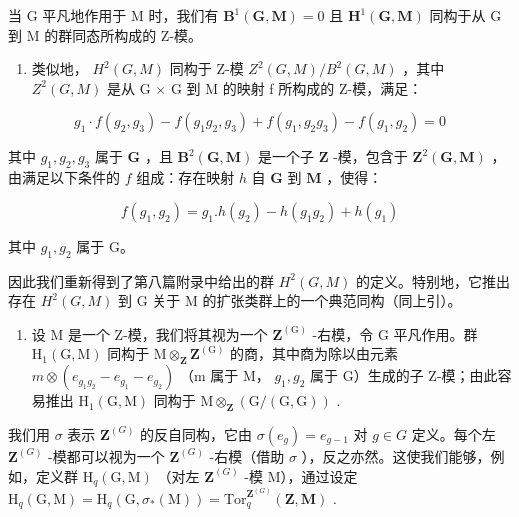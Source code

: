 当 G 平凡地作用于 M 时，我们有 \(\mathbf{B}^{1}(\mathbf{G},\mathbf{M})=0\) 且 \(\mathbf{H}^{1}(\mathbf{G},\mathbf{M})\) 同构于从 G 到 M 的群同态所构成的 Z-模。

\begin{enumerate}
\def\labelenumi{\arabic{enumi})}
\setcounter{enumi}{2}
\tightlist
\item
  类似地， \(H^{2}(G, M)\) 同构于 Z-模 \(Z^{2}(G, M)/B^{2}(G, M)\) ，其中 \(Z^{2}(G, M)\) 是从 G × G 到 M 的映射 f 所构成的 Z-模，满足：
\end{enumerate}

\[
g _ {1} \cdot f (g _ {2}, g _ {3}) - f (g _ {1} g _ {2}, g _ {3}) + f (g _ {1}, g _ {2} g _ {3}) - f (g _ {1}, g _ {2}) = 0
\]

其中 \(g_{1}, g_{2}, g_{3}\) 属于 \(\mathbf{G}\) ，且 \(\mathbf{B}^{2}(\mathbf{G}, \mathbf{M})\) 是一个子 \(\mathbf{Z}\) -模，包含于 \(\mathbf{Z}^{2}(\mathbf{G}, \mathbf{M})\) ，由满足以下条件的 \(f\) 组成：存在映射 \(h\) 自 \(\mathbf{G}\) 到 \(\mathbf{M}\) ，使得：

\[
f (g _ {1}, g _ {2}) = g _ {1}. h (g _ {2}) - h (g _ {1} g _ {2}) + h (g _ {1})
\]

其中 \(g_{1}, g_{2}\) 属于 G。

因此我们重新得到了第八篇附录中给出的群 \(H^{2}(G, M)\) 的定义。特别地，它推出存在 \(H^{2}(G, M)\) 到 G 关于 M 的扩张类群上的一个典范同构（同上引）。

\begin{enumerate}
\def\labelenumi{\arabic{enumi})}
\setcounter{enumi}{3}
\tightlist
\item
  设 M 是一个 Z-模，我们将其视为一个 \(\mathbf{Z}^{(\mathrm{G})}\) -右模，令 G 平凡作用。群 \(\mathrm{H}_{1}(\mathrm{G},\mathrm{M})\) 同构于 \(\mathrm{M}\otimes_{\mathbf{Z}}\mathbf{Z}^{(\mathrm{G})}\) 的商，其中商为除以由元素 \(m\otimes(e_{g_{1}g_{2}}-e_{g_{1}}-e_{g_{2}})\) （m 属于 M， \(g_{1}, g_{2}\) 属于 G）生成的子 Z-模；由此容易推出 \(\mathrm{H}_{1}(\mathrm{G},\mathrm{M})\) 同构于 \(\mathrm{M}\otimes_{\mathbf{Z}}(\mathrm{G}/(\mathrm{G},\mathrm{G}))\) .
\end{enumerate}

我们用 \(\sigma\) 表示 \(\mathbf{Z}^{(G)}\) 的反自同构，它由 \(\sigma(e_g) = e_{g-1}\) 对 \(g \in G\) 定义。每个左 \(\mathbf{Z}^{(G)}\) -模都可以视为一个 \(\mathbf{Z}^{(G)}\) -右模（借助 \(\sigma\) ），反之亦然。这使我们能够，例如，定义群 \(\mathrm{H}_q(\mathrm{G}, \mathrm{M})\) （对左 \(\mathbf{Z}^{(G)}\) -模 M），通过设定 \(\mathrm{H}_q(\mathrm{G}, \mathrm{M}) = \mathrm{H}_q(\mathrm{G}, \sigma_*(\mathrm{M})) = \mathrm{Tor}_q^{\mathbf{Z}^{(G)}}(\mathbf{Z}, \mathbf{M})\) .

